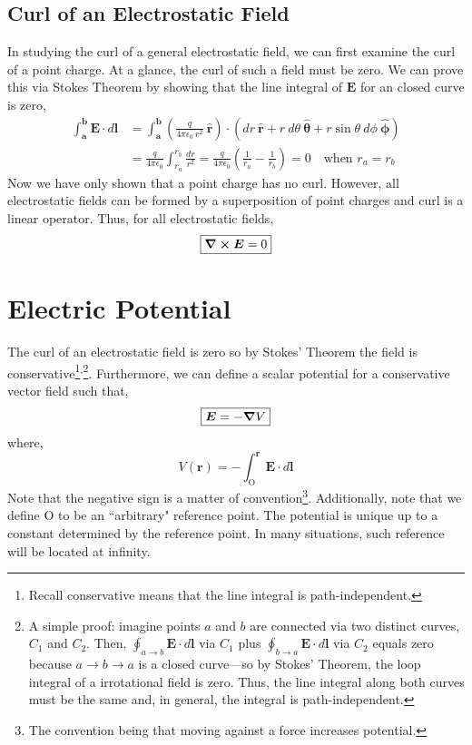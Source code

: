 \documentclass[12pt]{report}
\numberwithin{equation}{section}
\def\E{{\mbox{$\boldsymbol{E}$}}}
\begin{document}
	\subsection{Curl of an Electrostatic Field}
	In studying the curl of a general electrostatic field, we can first examine the curl of a point charge. At a glance, the curl of such a field must be zero. We can prove this via Stokes Theorem by showing that the line integral of $ \boldsymbol{E} $ for an closed curve is zero,
	\begin{align}
		\int_{\boldsymbol{a}}^{\boldsymbol{b}} \boldsymbol{E}\cdot d\boldsymbol{l} & =\int_{\boldsymbol{a}}^{\boldsymbol{b}} \left( \frac{q}{4\pi\epsilon_0\ r^2}\ \boldsymbol{\hat{r}}\right) \cdot \left(dr\ \boldsymbol{\hat{r}} + r\ d\theta\ \boldsymbol{\hat{\theta}} + r\sin\theta\ d\phi\ \boldsymbol{\hat{\phi}}\right)\\
		&= \frac{q}{4\pi\epsilon_0}\int_{r_a}^{r_b} \frac{dr}{r^2} = \frac{q}{4\pi\epsilon_0} \left(\frac{1}{r_a} - \frac{1}{r_b}\right) = 0 \quad\text{when }r_a=r_b
	\end{align}
	Now we have only shown that a point charge has no curl. However, all electrostatic fields can be formed by a superposition of point charges and curl is a linear operator. Thus, for all electrostatic fields,
	\begin{equation}
		\boxed{\curl \boldsymbol{E} = 0}
	\end{equation}
	
	\section{Electric Potential}
	
	The curl of an electrostatic field is zero so by Stokes' Theorem  the field is conservative\footnote{Recall conservative means that the line integral is path-independent.}\textsuperscript{,}\footnote{A simple proof: imagine points $ a $ and $ b $ are connected via two distinct curves, $ C_1 $ and $ C_2 $. Then, $ \oint_{a\to b}\boldsymbol{E}\cdot d\boldsymbol{l}$ via $ C_1 $ plus $ \oint_{b\to a}\boldsymbol{E}\cdot d\boldsymbol{l}$ via $ C_2 $ equals zero because $ a\to b\to a $ is a closed curve---so by Stokes' Theorem, the loop integral of a irrotational field is zero. Thus, the line integral along both curves must be the same and, in general, the integral is path-independent.}. Furthermore, we can define a scalar potential for a conservative vector field such that,
	\begin{equation}
		\boxed{\E = -\grad{V}}
	\end{equation}
	where,
	\begin{equation}
		\boxed{V(\boldsymbol{r}) = -\int_{\text{O}}^{\boldsymbol{r}} \boldsymbol{E}\cdot d\boldsymbol{l}}
	\end{equation}
	Note that the negative sign is a matter of convention\footnote{The convention being that moving against a force increases potential.}. Additionally, note that we define $ \text{O} $ to be an ``arbitrary" reference point. The potential is unique up to a constant determined by the reference point. In many situations, such reference will be located at infinity.
	
\end{document}
